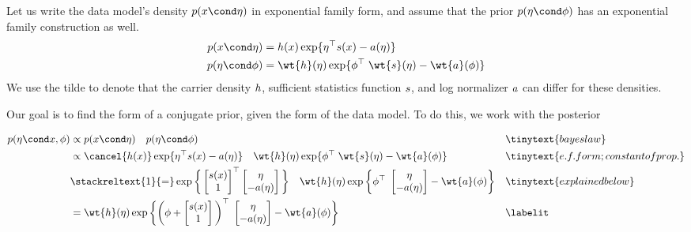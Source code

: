 
Let us write the data model's density $p(x \cond \eta)$ in exponential family form, and assume that the prior $p(\eta \cond \phi)$ has an exponential family construction as well.  
\begin{align*}
p(x \cond \eta) &= \carrierDensity(x) \exp \{\eta^\top \sufficientStatsFunction(x) - \logNormalizerFunction(\eta)   \}	 \\
p(\eta \cond \phi) &= \wt{h}(\eta) \exp \{\phi^\top \; \wt{\sufficientStatsFunction}(\eta) - \wt{\logNormalizerFunction}(\phi)   \}	
\end{align*}
We use the tilde to denote that the carrier density $h$, sufficient statistics function $s$, and log normalizer $a$ can differ for these densities.  

Our goal is to find the form of a conjugate prior, given the form of the data model.    To do this, we work with the posterior 

\begin{align*}
p(\eta \cond x, \phi) & \propto p(x \cond \eta) \quad p(\eta \cond \phi) && \tinytext{bayes law}  \\
&\propto  \cancel{\carrierDensity(x)} \exp \{\eta^\top \sufficientStatsFunction(x) - \logNormalizerFunction(\eta)  \}  \quad \wt{h}(\eta) \exp \{\phi^\top \; \wt{\sufficientStatsFunction}(\eta) - \wt{\logNormalizerFunction}(\phi)   \}	&& \tinytext{e.f. form; constant of prop.}\\
& \stackreltext{1}{=} \exp \bigg\{
\begin{bmatrix} 
\sufficientStatsFunction(x) \\
1 \\
\end{bmatrix}^\top
\begin{bmatrix} 
\eta \\
-\logNormalizerFunction(\eta)
\end{bmatrix}
\bigg\} \quad 
\wt{h}(\eta) \exp \bigg\{ \phi^\top \; \begin{bmatrix} 
\eta \\
-\logNormalizerFunction(\eta)
\end{bmatrix} - \wt{\logNormalizerFunction}(\phi)  \bigg\} && \tinytext{explained below} \\
&= \wt{h}(\eta) \exp \bigg\{ \bigg( \phi + \begin{bmatrix} 
\sufficientStatsFunction(x) \\
1 \\
\end{bmatrix} \bigg)^\top \; \begin{bmatrix} 
\eta \\
-\logNormalizerFunction(\eta)
\end{bmatrix} - \wt{\logNormalizerFunction}(\phi)  \bigg\} && 
\labelit \label{eqn:posterior_under_conjugate_prior}\\
\end{align*}

